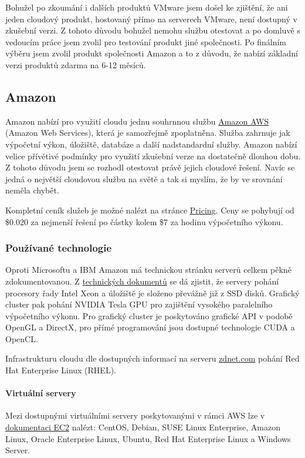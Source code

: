 Bohužel po zkoumání i dalších produktů VMware jsem došel ke zjištění, že ani jeden cloudový produkt, hostovaný přímo na serverech VMware, není dostupný v zkušební verzi. Z tohoto důvodu bohužel nemohu službu otestovat a po domluvě s vedoucím práce jsem zvolil pro testování produkt jiné společnosti. Po finálním výběru jsem zvolil produkt společnosti Amazon a to z důvodu, že nabízí základní verzi produktů zdarma na 6-12 měsíců.

\subsection{Amazon}
Amazon nabízí pro využití cloudu jednu souhrnnou službu \href{http://aws.amazon.com/}{Amazon AWS\cite{amazon:aws}} (Amazon Web Services), která je samozřejmě zpoplatněna. Služba zahrnuje jak výpočetní výkon, úložiště, databáze a další nadstandardní služby. Amazon nabízí velice přívětivé podmínky pro využití zkušební verze na dostatečně dlouhou dobu. Z tohoto důvodu jsem se rozhodl otestovat právě jejich cloudové řešení. Navíc se jedná o největší cloudovou službu na světě a tak si myslím, že by ve srovnání neměla chybět.

Kompletní ceník služeb je možné nalézt na stránce \href{http://aws.amazon.com/ec2/pricing/}{Pricing\cite{amazon:ec2Pricing}}. Ceny se pohybují od \$0.020 za nejmenší řešení po částky kolem \$7 za hodinu výpočetního výkonu.

\subsubsection{Používané technologie}
Oproti Microsoftu a IBM Amazon má technickou stránku serverů celkem pěkně zdokumentovanou. Z \href{http://aws.amazon.com/ec2/instance-types/}{technických dokumentů\cite{amazon:ec2Instances}} se dá zjistit, že servery pohání procesory řady Intel Xeon a úložiště je složeno převážně již z SSD disků. Grafický cluster pak pohání NVIDIA Tesla GPU pro zajištění vysokého paralelního výpočetního výkonu. Pro grafický cluster je poskytováno grafické API v podobě OpenGL a DirectX, pro přímé programování jsou dostupné technologie CUDA a OpenCL.

Infrastrukturu cloudu dle dostupných informací na serveru \href{http://www.zdnet.com/blog/open-source/amazon-ec2-cloud-is-made-up-of-almost-half-a-million-linux-servers/10620}{zdnet.com\cite{zdnet:amazonLinux}} pohání Red Hat Enterprise Linux (RHEL).

\paragraph{Virtuální servery}
Mezi dostupnými virtuálními servery poskytovanými v rámci AWS lze v \href{http://aws.amazon.com/ec2/details/}{dokumentaci EC2\cite{amazon:ec2Details}} nalézt: CentOS, Debian, SUSE Linux Enterprise, Amazon Linux, Oracle Enterprise Linux, Ubuntu, Red Hat Enterprise Linux a Windows Server.


